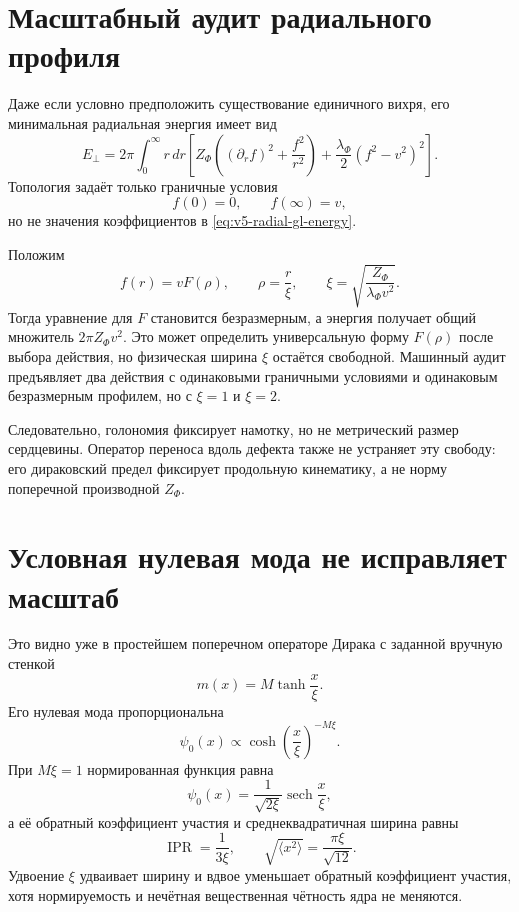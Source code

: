 \section{Масштабный аудит радиального профиля}

Даже если условно предположить существование единичного вихря, его
минимальная радиальная энергия имеет вид
\begin{equation}
 E_\perp=2\pi\int_0^\infty r\,dr\left[
 Z_\Phi\left((\partial_r f)^2+\frac{f^2}{r^2}\right)
 +\frac{\lambda_\Phi}{2}(f^2-v^2)^2
 \right].
 \label{eq:v5-radial-gl-energy}
\end{equation}
Топология задаёт только граничные условия
\begin{equation}
 f(0)=0,\qquad f(\infty)=v,
\end{equation}
но не значения коэффициентов в \eqref{eq:v5-radial-gl-energy}.

Положим
\begin{equation}
 f(r)=vF(\rho),\qquad
 \rho=\frac r\xi,\qquad
 \xi=\sqrt{\frac{Z_\Phi}{\lambda_\Phi v^2}}.
 \label{eq:v5-coherence-length}
\end{equation}
Тогда уравнение для $F$ становится безразмерным, а энергия получает общий
множитель $2\pi Z_\Phi v^2$. Это может определить универсальную форму
$F(\rho)$ после выбора действия, но физическая ширина $\xi$ остаётся
свободной. Машинный аудит предъявляет два действия с одинаковыми
граничными условиями и одинаковым безразмерным профилем, но с
$\xi=1$ и $\xi=2$.

Следовательно, голономия фиксирует намотку, но не метрический размер
сердцевины. Оператор переноса вдоль дефекта также не устраняет эту
свободу: его дираковский предел фиксирует продольную кинематику, а не
норму поперечной производной $Z_\Phi$.

\section{Условная нулевая мода не исправляет масштаб}

Это видно уже в простейшем поперечном операторе Дирака с заданной вручную
стенкой
\begin{equation}
 m(x)=M\tanh\frac{x}{\xi}.
\end{equation}
Его нулевая мода пропорциональна
\begin{equation}
 \psi_0(x)\propto
 \cosh\!\left(\frac{x}{\xi}\right)^{-M\xi}.
 \label{eq:v5-domain-wall-zero}
\end{equation}
При $M\xi=1$ нормированная функция равна
\begin{equation}
 \psi_0(x)=\frac1{\sqrt{2\xi}}\operatorname{sech}\frac{x}{\xi},
\end{equation}
а её обратный коэффициент участия и среднеквадратичная ширина равны
\begin{equation}
 \operatorname{IPR}=\frac1{3\xi},\qquad
 \sqrt{\langle x^2\rangle}=\frac{\pi\xi}{\sqrt{12}}.
 \label{eq:v5-localization-width}
\end{equation}
Удвоение $\xi$ удваивает ширину и вдвое уменьшает обратный коэффициент
участия, хотя нормируемость и нечётная вещественная чётность ядра не
меняются.

